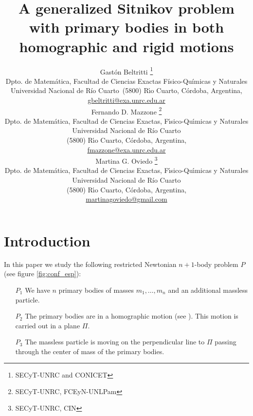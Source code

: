 \documentclass[twoside]{article}
\title{A generalized Sitnikov problem with primary bodies in both homographic and rigid motions}
\author{Gast\'on Beltritti \thanks{SECyT-UNRC and CONICET}\\
Dpto. de Matem\'atica, Facultad de Ciencias Exactas Físico-Químicas y Naturales\\
Universidad Nacional de R\'{i}o Cuarto\
(5800) R\'{\i}o Cuarto, C\'ordoba, Argentina,\\
\url{gbeltritti@exa.unrc.edu.ar}\\[3mm]
Fernando D. Mazzone \thanks{SECyT-UNRC, FCEyN-UNLPam}\\
Dpto. de Matem\'atica, Facultad de Ciencias Exactas, F\'{\i}sico-Qu\'{\i}micas y Naturales\\
Universidad Nacional de R\'{i}o Cuarto\\
(5800) R\'{\i}o Cuarto, C\'ordoba, Argentina,\\
\url{fmazzone@exa.unrc.edu.ar}\\
Martina G. Oviedo \thanks{SECyT-UNRC, CIN}\\
Dpto. de Matem\'atica, Facultad de Ciencias Exactas, F\'{\i}sico-Qu\'{\i}micas y Naturales\\
Universidad Nacional de R\'{i}o Cuarto\\
(5800) R\'{\i}o Cuarto, C\'ordoba, Argentina,\\
\url{martinagoviedo@gmail.com}
}
\date{}
\theoremstyle{remark}
\begin{document}
\maketitle
%
%
%
%
%

\begin{abstract}


\end{abstract}




\pagestyle{fancy} \headheight 35pt \fancyhead{} \fancyfoot{}

\fancyfoot[C]{\thepage}  \fancyhead[CO]{\nouppercase{\section}}

\fancyhead[CO]{\nouppercase{\leftmark}}






\section{Introduction}
In this paper we study the following restricted  Newtonian $n+1$-body problem $P$ (see figure \ref{fig:conf_esp}):
\begin{itemize}
 \item[$P_1$] We have $n$ primary bodies of masses $m_1,\ldots,m_n$ and an additional massless particle.
 \item[$P_2$] The primary bodies are in a homographic motion (see \cite[Section 2.9]{JaumeLlibre276}). This motion is carried out in a plane $\Pi$.
 \item[$P_3$] The massless particle is moving  on the perpendicular line to $\Pi$ passing through the center of mass of the primary bodies.
\end{itemize}
\end{document}
